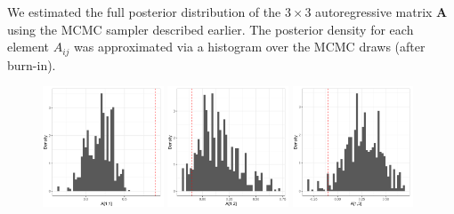 
We estimated the full posterior distribution of the $3 \times 3$ autoregressive matrix $\mathbf{A}$ using the MCMC sampler described earlier. The posterior density for each element $A_{ij}$ was approximated via a histogram over the MCMC draws (after burn-in).

\begin{figure}[H]
    \centering
    \includegraphics[width=0.32\textwidth]{../figures/post_A11.png}
    \includegraphics[width=0.32\textwidth]{../figures/post_A12.png}
    \includegraphics[width=0.32\textwidth]{../figures/post_A13.png}
    

\end{figure}
